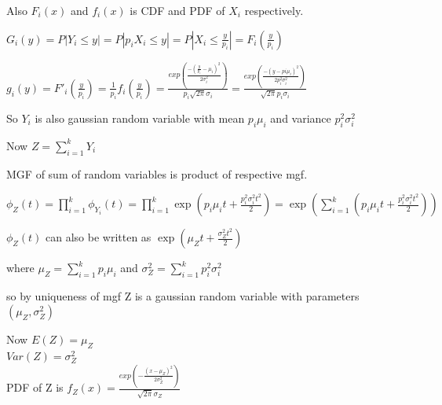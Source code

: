 \documentclass{article}
\begin{document}
    Also $F_i(x)$ and $f_i(x)$ is CDF and PDF of $X_i$ respectively.\par
    $G_i(y) = P|Y_i \leq y | = P|p_iX_i \leq y| = P|X_i \leq \frac{y}{p_i}| = F_i(\frac{y}{p_i})$\par 
    $g_i(y) = F'_i(\frac{y}{p_i}) =  \frac{1}{p_i}f_i(\frac{y}{p_i}) = \frac{exp(\frac{-(\frac{y}{p_i} - \mu_i)^2}{2\sigma_i^2})}{p_i\sqrt{2\pi}\sigma_i} = \frac{exp(\frac{-(y - pi\mu_i)^2}{2p_i^2\sigma_i^2})}{\sqrt{2\pi}p_i\sigma_i}$\par
    So $Y_i$ is also gaussian random variable with mean $p_i\mu_i$ and variance $p_i^2\sigma_i^2$\par
    Now $Z = \sum_{i=1}^kY_i$\par
    MGF of sum of random variables is product of respective mgf.\par
    $\phi_Z(t) = \prod_{i=1}^k\phi_{Y_i}(t) = \prod_{i=1}^k\exp(p_i\mu_it + \frac{p_i^2\sigma_i^2t^2}{2}) = \exp(\sum_{i=1}^k(p_i\mu_it + \frac{p_i^2\sigma_i^2t^2}{2}))$\par
    $\phi_Z(t)$ can also be written as $\exp(\mu_Zt + \frac{\sigma_Z^2t^2}{2})$\par where $\mu_Z = \sum_{i=1}^kp_i\mu_i$ and $\sigma_Z^2 = \sum_{i=1}^kp_i^2\sigma_i^2$\par so by uniqueness of mgf Z is a gaussian random variable with parameters$(\mu_Z, \sigma_Z^2)$\par
    Now $E(Z) = \mu_Z$\\
    $Var(Z) = \sigma_Z^2$\\
    PDF of Z is $f_Z(x) =  \frac{exp(-\frac{(x-\mu_Z)^2}{2\sigma_Z^2})}{\sqrt{2\pi}{\sigma_Z}}$
\end{document}
